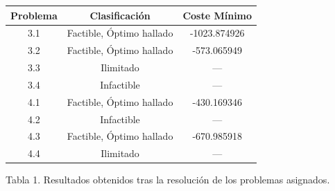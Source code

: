 \documentclass[11pt]{article}
\begin{document}
\begin{center}
    \begin{tabular}{c c c}
    \hline
    \textbf{Problema} & \textbf{Clasificación} & \textbf{Coste Mínimo} \\
    \hline
    3.1 & Factible, Óptimo hallado & -1023.874926\\
    3.2 & Factible, Óptimo hallado & -573.065949 \\
    3.3 & Ilimitado & --- \\
    3.4 & Infactible & --- \\
    4.1 & Factible, Óptimo hallado & -430.169346 \\
    4.2 & Infactible & --- \\
    4.3 & Factible, Óptimo hallado & -670.985918 \\
    4.4 & Ilimitado & --- \\
    \hline
    \end{tabular}
\end{center}
\begin{center}
    Tabla 1. Resultados obtenidos tras la resolución de los problemas asignados.
\end{center}
\end{document}
